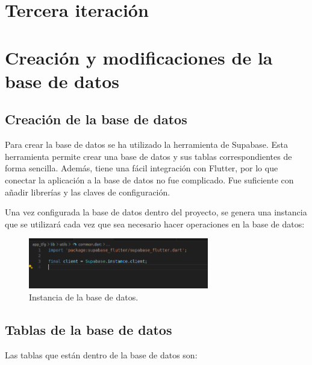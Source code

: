 \section{Tercera iteración}

\section{Creación y modificaciones de la base de datos}

\subsection{Creación de la base de datos}

Para crear la base de datos se ha utilizado la herramienta de Supabase. Esta herramienta permite crear una base de datos y sus tablas correspondientes de forma sencilla. Además, tiene una fácil integración con Flutter, por lo que conectar la aplicación a la base de datos no fue complicado. Fue suficiente con añadir librerías y las claves de configuración.  

Una vez configurada la base de datos dentro del proyecto, se genera una instancia que se utilizará cada vez que sea necesario hacer operaciones en la base de datos: 

\begin{figure}[H]
	\centering
	\includegraphics[width=0.7\textwidth]{imagenes/clientBD.png}
	\caption{Instancia de la base de datos.}
	\label{fig:instanciaBD}
\end{figure}

\subsection{Tablas de la base de datos}

Las tablas que están dentro de la base de datos son: 


